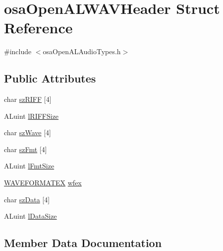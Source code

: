 \hypertarget{structosa_open_a_l_w_a_v_header}{}\section{osa\+Open\+A\+L\+W\+A\+V\+Header Struct Reference}
\label{structosa_open_a_l_w_a_v_header}


{\ttfamily \#include $<$osa\+Open\+A\+L\+Audio\+Types.\+h$>$}

\subsection*{Public Attributes}
\begin{DoxyCompactItemize}
\item 
char \hyperlink{structosa_open_a_l_w_a_v_header_a098b6f18d3e7817dfeba64ae1494d0f2}{sz\+R\+I\+F\+F} \mbox{[}4\mbox{]}
\item 
A\+Luint \hyperlink{structosa_open_a_l_w_a_v_header_a04e8f4c2ebbf85c469a39ea853e7cb30}{l\+R\+I\+F\+F\+Size}
\item 
char \hyperlink{structosa_open_a_l_w_a_v_header_a00ca16e2cba4d79c653c1a0d49ca4661}{sz\+Wave} \mbox{[}4\mbox{]}
\item 
char \hyperlink{structosa_open_a_l_w_a_v_header_a33de8f968564c7835cda9715a9f51956}{sz\+Fmt} \mbox{[}4\mbox{]}
\item 
A\+Luint \hyperlink{structosa_open_a_l_w_a_v_header_a983ec0809ed5b0c048f690c82507a837}{l\+Fmt\+Size}
\item 
\hyperlink{struct_w_a_v_e_f_o_r_m_a_t_e_x}{W\+A\+V\+E\+F\+O\+R\+M\+A\+T\+E\+X} \hyperlink{structosa_open_a_l_w_a_v_header_a1bb12a739dfc5150d78795214c528d8a}{wfex}
\item 
char \hyperlink{structosa_open_a_l_w_a_v_header_ad8a2cc5a4501d35bff7d80ea75af0fc4}{sz\+Data} \mbox{[}4\mbox{]}
\item 
A\+Luint \hyperlink{structosa_open_a_l_w_a_v_header_af0e05d9dcd89274788369693a7c4ebaf}{l\+Data\+Size}
\end{DoxyCompactItemize}


\subsection{Member Data Documentation}
\hypertarget{structosa_open_a_l_w_a_v_header_af0e05d9dcd89274788369693a7c4ebaf}{}
